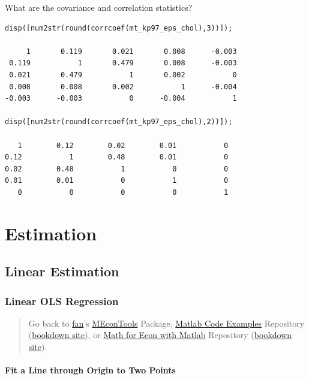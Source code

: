 \documentclass[
]{book}
\begin{document}
What are the covariance and correlation statistics?

\begin{verbatim}
disp([num2str(round(corrcoef(mt_kp97_eps_chol),3))]);

     1       0.119       0.021       0.008      -0.003
 0.119           1       0.479       0.008      -0.003
 0.021       0.479           1       0.002           0
 0.008       0.008       0.002           1      -0.004
-0.003      -0.003           0      -0.004           1

disp([num2str(round(corrcoef(mt_kp97_eps_chol),2))]);

   1        0.12        0.02        0.01           0
0.12           1        0.48        0.01           0
0.02        0.48           1           0           0
0.01        0.01           0           1           0
   0           0           0           0           1
\end{verbatim}

\hypertarget{estimation}{%
\chapter{Estimation}\label{estimation}}

\hypertarget{linear-estimation}{%
\section{Linear Estimation}\label{linear-estimation}}

\hypertarget{linear-ols-regression}{%
\subsection{Linear OLS Regression}\label{linear-ols-regression}}

\begin{quote}
Go back to \href{http://fanwangecon.github.io/}{fan}'s \href{https://fanwangecon.github.io/MEconTools/}{MEconTools} Package, \href{https://fanwangecon.github.io/M4Econ/}{Matlab Code Examples} Repository (\href{https://fanwangecon.github.io/M4Econ/bookdown}{bookdown site}), or \href{https://fanwangecon.github.io/Math4Econ/}{Math for Econ with Matlab} Repository (\href{https://fanwangecon.github.io/Math4Econ/bookdown}{bookdown site}).
\end{quote}

\hypertarget{fit-a-line-through-origin-to-two-points}{%
\subsubsection{Fit a Line through Origin to Two Points}\label{fit-a-line-through-origin-to-two-points}}
\end{document}
